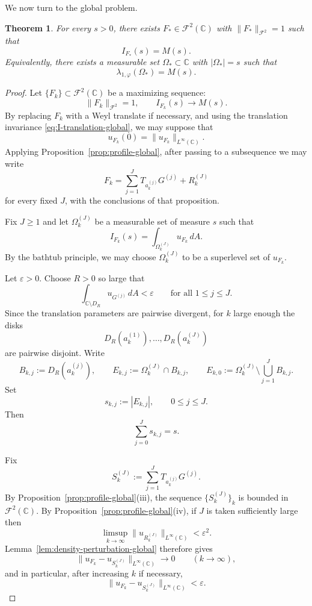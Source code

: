 \documentclass[a4paper,11pt,reqno]{amsart}
\numberwithin{equation}{section}
\theoremstyle{plain} %
\newtheorem{theorem}{Theorem}
\theoremstyle{definition} %
\theoremstyle{remark}
\newcommand{\C}{\mathbb{C}}
\begin{document}
We now turn to the global problem.

\begin{theorem}\label{thm:existence-global-maximizer}
For every \(s>0\), there exists \(F_*\in \mathcal F^2(\C)\) with
\(\|F_*\|_{\mathcal F^2}=1\) such that
\[
I_{F_*}(s)=M(s).
\]
Equivalently, there exists a measurable set \(\Omega_*\subset \C\) with
\(|\Omega_*|=s\) such that
\[
\lambda_{1,\varphi}(\Omega_*)=M(s).
\]
\end{theorem}

\begin{proof}
Let \(\{F_k\}\subset \mathcal F^2(\C)\) be a maximizing sequence:
\[
\|F_k\|_{\mathcal F^2}=1,
\qquad
I_{F_k}(s)\to M(s).
\]
By replacing \(F_k\) with a Weyl translate if necessary, and using the
translation invariance \eqref{eq:I-translation-global}, we may suppose that
\[
u_{F_k}(0)=\|u_{F_k}\|_{L^\infty(\C)}.
\]
Applying Proposition~\ref{prop:profile-global}, after passing to a subsequence we
may write
\[
F_k=\sum_{j=1}^J T_{a_k^{(j)}}G^{(j)}+R_k^{(J)}
\]
for every fixed \(J\), with the conclusions of that proposition.

Fix \(J\ge 1\) and let \(\Omega_k^{(J)}\) be a measurable set of measure \(s\)
such that
\[
I_{F_k}(s)=\int_{\Omega_k^{(J)}} u_{F_k}\,dA.
\]
By the bathtub principle, we may choose \(\Omega_k^{(J)}\) to be a superlevel set
of \(u_{F_k}\).

Let \(\varepsilon>0\). Choose \(R>0\) so large that
\[
\int_{\C\setminus D_R} u_{G^{(j)}}\,dA<\varepsilon
\qquad\text{for all } 1\le j\le J.
\]
Since the translation parameters are pairwise divergent, for \(k\) large enough
the disks
\[
D_R(a_k^{(1)}),\dots,D_R(a_k^{(J)})
\]
are pairwise disjoint. Write
\[
B_{k,j}:=D_R(a_k^{(j)}),
\qquad
E_{k,j}:=\Omega_k^{(J)}\cap B_{k,j},
\qquad
E_{k,0}:=\Omega_k^{(J)}\setminus \bigcup_{j=1}^J B_{k,j}.
\]
Set
\[
s_{k,j}:=|E_{k,j}|,
\qquad 0\le j\le J.
\]
Then
\[
\sum_{j=0}^J s_{k,j}=s.
\]

Fix
\[
S_k^{(J)}:=\sum_{j=1}^J T_{a_k^{(j)}}G^{(j)}.
\]
By Proposition~\ref{prop:profile-global}(iii), the sequence \(\{S_k^{(J)}\}_k\) is
bounded in \(\mathcal F^2(\C)\). By Proposition~\ref{prop:profile-global}(iv), if
\(J\) is taken sufficiently large then
\[
\limsup_{k\to\infty}\|u_{R_k^{(J)}}\|_{L^\infty(\C)}<\varepsilon^2.
\]
Lemma~\ref{lem:density-perturbation-global} therefore gives
\[
\|u_{F_k}-u_{S_k^{(J)}}\|_{L^\infty(\C)}\to 0
\qquad (k\to\infty),
\]
and in particular, after increasing \(k\) if necessary,
\begin{equation}\label{eq:density-approximation-global}
\|u_{F_k}-u_{S_k^{(J)}}\|_{L^\infty(\C)}<\varepsilon.
\end{equation}


\end{proof}
\end{document}
